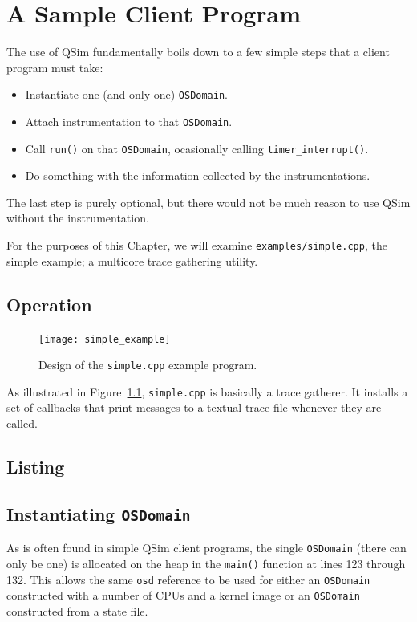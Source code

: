 \documentclass[letterpaper, 10pt]{book}
\begin{document}
\chapter{A Sample Client Program} \label{chap:example}
The use of QSim fundamentally boils down to a few simple steps that a client
program must take:
\begin{itemize}
  \item{Instantiate one (and only one) \texttt{OSDomain}.}
  \item{Attach instrumentation to that \texttt{OSDomain}.}
  \item{Call \texttt{run()} on that \texttt{OSDomain}, ocasionally calling
        \texttt{timer\_interrupt()}.} 
  \item{Do something with the information collected by the instrumentations.}
\end{itemize}

The last step is purely optional, but there would not be much reason to use
QSim without the instrumentation.

For the purposes of this Chapter, we will examine \texttt{examples/simple.cpp},
the simple example; a multicore trace gathering utility.

\section{Operation}

\begin{figure}
\begin{center}
\texttt{[image: simple\_example]}
\caption{Design of the \texttt{simple.cpp} example program.}
\label{fig:simplecpp}
\end{center}
\end{figure}

As illustrated in Figure~\ref{fig:simplecpp}, \texttt{simple.cpp} is basically a
trace gatherer. It installs a set of callbacks that print messages to a textual
trace file whenever they are called.

\section{Listing}


\section{Instantiating \texttt{OSDomain}}
As is often found in simple QSim client programs, the single \texttt{OSDomain}
(there can only be one) is allocated on the heap in the \texttt{main()}
function at lines 123 through 132. This allows the same \texttt{osd} reference
to be used for either an \texttt{OSDomain} constructed with a number of CPUs and
a kernel image or an \texttt{OSDomain} constructed from a state file.
\end{document}
